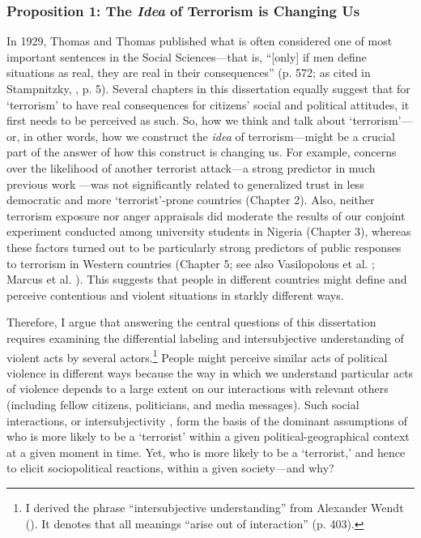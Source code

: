 \subsubsection{Proposition 1: The \textit{Idea} of Terrorism is Changing Us}

In 1929, Thomas and Thomas published what is often considered one of most important sentences in the Social Sciences---that is, ``[only] if men define situations as real, they are real in their consequences'' (p. 572; as cited in Stampnitzky, \citeyear{Stampnitzky2013}, p. 5). Several chapters in this dissertation equally suggest that for `terrorism' to have real consequences for citizens' social and political attitudes, it first needs to be perceived as such. So, how we think and talk about `terrorism'---or, in other words, how we construct the \textit{idea} of terrorism---might be a crucial part of the answer of how this construct is changing us. For example, concerns over the likelihood of another terrorist attack---a strong predictor in much previous work \citep[e.g.,][]{Huddy2005, Davis2004, Cohrs2005a}---was not significantly related to generalized trust in less democratic and more `terrorist'-prone countries (Chapter 2). Also, neither terrorism exposure nor anger appraisals did moderate the results of our conjoint experiment conducted among university students in Nigeria (Chapter 3), whereas these factors turned out to be particularly strong predictors of public responses to terrorism in Western countries (Chapter 5; see also Vasilopolous et al. \citeyear{Vasilopoulos2018, Vasilopoulos2019c}; Marcus et al. \citeyear{Marcus2019}). This suggests that people in different countries might define and perceive contentious and violent situations in starkly different ways.


Therefore, I argue that answering the central questions of this dissertation requires examining the differential labeling and intersubjective understanding of violent acts by several actors.\footnote{I derived the phrase “intersubjective understanding” from Alexander Wendt (\citeyear{Wendt1992}). It denotes that all meanings ``arise out of interaction'' (p. 403).} People might perceive similar acts of political violence in different ways because the way in which we understand particular acts of violence depends to a large extent on our interactions with relevant others (including fellow citizens, politicians, and media messages). Such social interactions, or intersubjectivity \citep{Duranti2010}, form the basis of the dominant assumptions of who is more likely to be a `terrorist' within a given political-geographical context at a given moment in time. Yet, who is more likely to be a `terrorist,' and hence to elicit sociopolitical reactions, within a given society---and why?



